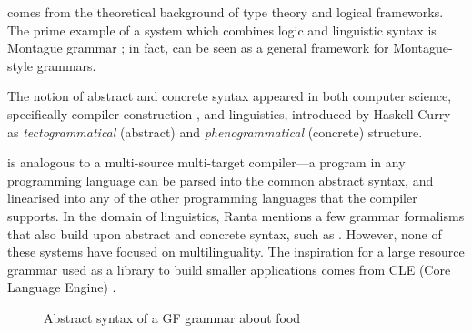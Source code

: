 \gf{} comes from the theoretical background of type theory and logical
frameworks. The prime example of a system which combines logic and
linguistic syntax is Montague grammar \cite{montague}; in fact, \gf{}
can be seen as a general framework for Montague-style grammars.

The notion of abstract and concrete syntax appeared in both computer
science, specifically compiler construction \cite{mccarthy62}, and
linguistics, introduced by Haskell Curry \cite{curry1961} as
\emph{tectogrammatical} (abstract) and \emph{phenogrammatical}
(concrete) structure.

\gf{} is analogous to a multi-source multi-target compiler---a program
in any programming language can be parsed into the common abstract
syntax, and linearised into any of the other programming languages
that the compiler supports.  In the domain of linguistics, Ranta
\cite{ranta2011gfbook} mentions a few grammar formalisms that also
build upon abstract and concrete syntax, such as
\cite{deGroote2001acg,pollard2004hog,muskens2001lambda}. However, none
of these systems have focused on multilinguality.
The inspiration for a large resource grammar used as a library to
build smaller applications comes from  CLE (Core Language Engine)
\cite{CLE,cle2}.


\begin{figure}[h]
\centering

\begin{Shaded}
\begin{Highlighting}[]
 \FunctionTok{=} \NormalTok{\{}
  \FunctionTok{=}  \NormalTok{;}
     \NormalTok{; } \NormalTok{; } \NormalTok{; } \NormalTok{;}
    \OtherTok{ :}  \OtherTok{->}  \OtherTok{->}  \NormalTok{;                 }
    \NormalTok{, }\NormalTok{, }\NormalTok{, }\OtherTok{ :}  \OtherTok{->}  \NormalTok{;           }
    \OtherTok{ :}  \OtherTok{->}  \OtherTok{->}  \NormalTok{;                     }
    \NormalTok{, }\NormalTok{, }\NormalTok{, }\OtherTok{ :}  \NormalTok{;}
    \NormalTok{, }\NormalTok{, }\NormalTok{, }\OtherTok{ :}  \NormalTok{;}
\end{Highlighting}
\end{Shaded}
  \caption{Abstract syntax of a GF grammar about food}
\label{fig:foods}
\end{figure}

